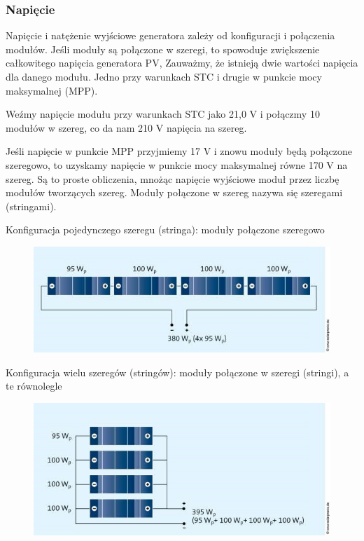 \documentclass[12pt,a4paper]{article}
\begin{document}
\subsubsection{Napięcie}

Napięcie i natężenie wyjściowe generatora zależy od konfiguracji i 
połączenia modułów. Jeśli moduły są połączone w szeregi, to spowoduje 
zwiększenie całkowitego napięcia generatora PV, Zauważmy, że istnieją 
dwie wartości napięcia dla danego modułu. Jedno przy warunkach STC i 
drugie w punkcie mocy maksymalnej (MPP). 

Weźmy napięcie modułu przy warunkach STC jako 21,0 V i połączmy 10 
modułów w szereg, co da nam 210 V napięcia na szereg. 

Jeśli napięcie w punkcie MPP przyjmiemy 17 V i znowu moduły będą połączone szeregowo, to uzyskamy napięcie w punkcie mocy maksymalnej równe 170 V na szereg.
Są to proste obliczenia, mnożąc napięcie wyjściowe moduł przez liczbę modułów tworzących szereg. Moduły połączone w szereg nazywa się szeregami (stringami). 

Konfiguracja pojedynczego szeregu (stringa): moduły połączone szeregowo 

\begin{figure}[h]
\centering
\includegraphics[natwidth=15.92cm,natheight=5.67cm]{media/image12.jpg}
\end{figure}
 
Konfiguracja wielu szeregów (stringów): moduły połączone w szeregi 
(stringi), a te równolegle 

\begin{figure}[h]
\centering
\includegraphics[natwidth=15.92cm,natheight=7.11cm]{media/image13.jpg}
\end{figure}
 
\end{document}
